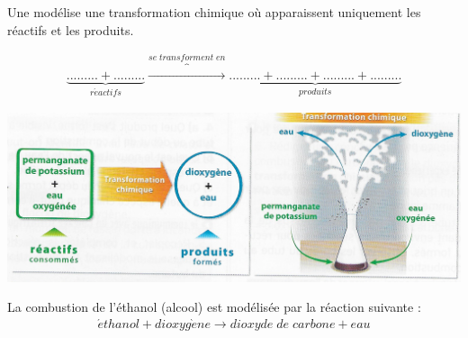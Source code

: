\documentclass[12pt,a4paper]{article}
\begin{document}
\begin{mybilan}
	Une  modélise une transformation chimique où apparaissent uniquement les réactifs et les produits.
	
	\begin{align*}
		\underbrace{......... + .........}_{r\acute{e}actifs} \overbrace{\rightarrow}^{se\; transforment\; en}  \underbrace{......... + ......... + ......... + .........}_{produits}
	\end{align*}


	\begin{center}
		\includegraphics[scale=0.3]{img/O2}
	\end{center}
\end{mybilan}

\begin{myex}
	La combustion de l'éthanol (alcool) est modélisée par la réaction suivante :
	\begin{align*}
		\acute{e}thanol + dioxyg\grave{e}ne \rightarrow dioxyde\; de \; carbone + eau 
	\end{align*}
\end{myex}
%
\end{document}
